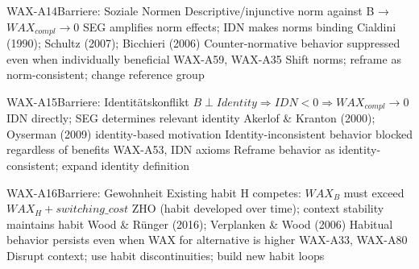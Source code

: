 
\begin{axiomspec}{WAX-A14}{Barriere: Soziale Normen}
 Descriptive/injunctive norm against B → $WAX_{compl} \rightarrow 0$
 SEG amplifies norm effects; IDN makes norms binding
 Cialdini (1990); Schultz (2007); Bicchieri (2006)
 Counter-normative behavior suppressed even when individually beneficial
 WAX-A59, WAX-A35
 Shift norms; reframe as norm-consistent; change reference group
\end{axiomspec}


\begin{axiomspec}{WAX-A15}{Barriere: Identitätskonflikt}
 $B \perp Identity \Rightarrow IDN < 0 \Rightarrow WAX_{compl} \rightarrow 0$
 IDN directly; SEG determines relevant identity
 Akerlof \& Kranton (2000); Oyserman (2009) identity-based motivation
 Identity-inconsistent behavior blocked regardless of benefits
 WAX-A53, IDN axioms
 Reframe behavior as identity-consistent; expand identity definition
\end{axiomspec}


\begin{axiomspec}{WAX-A16}{Barriere: Gewohnheit}
 Existing habit H competes: $WAX_B$ must exceed $WAX_H + switching\_cost$
 ZHO (habit developed over time); context stability maintains habit
 Wood \& Rünger (2016); Verplanken \& Wood (2006)
 Habitual behavior persists even when WAX for alternative is higher
 WAX-A33, WAX-A80
 Disrupt context; use habit discontinuities; build new habit loops
\end{axiomspec}

